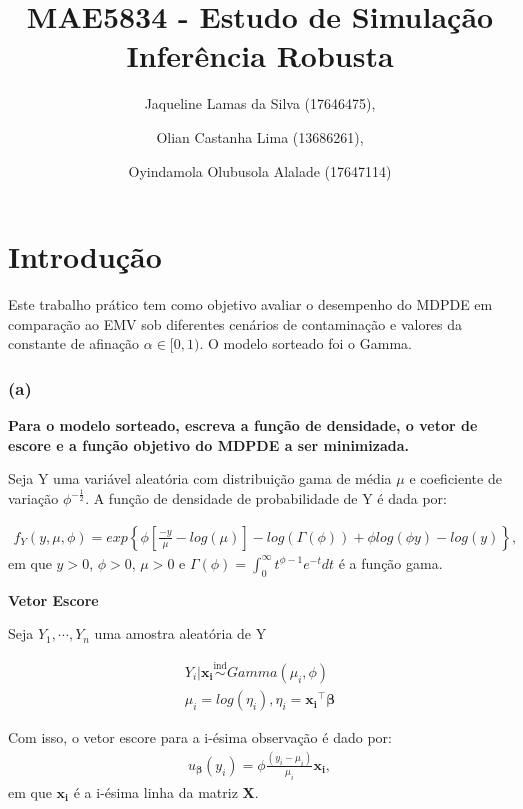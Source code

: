 \documentclass[
  letterpaper,
  DIV=11,
  numbers=noendperiod]{scrartcl}
\title{\LARGE \textbf{MAE5834 - Estudo de Simulação Inferência Robusta}}
\author{Jaqueline Lamas da Silva (17646475), \and Olian Castanha Lima
(13686261), \and Oyindamola Olubusola Alalade (17647114)}
\date{}
\renewcommand*\contentsname{Table of contents}
\newcommand\contentsname{Table of contents}
\begin{document}
\maketitle

\renewcommand*\contentsname{Sumário}
{
\setcounter{tocdepth}{3}
\tableofcontents
}

\newpage

\section{Introdução}\label{introduuxe7uxe3o}

Este trabalho prático tem como objetivo avaliar o desempenho do MDPDE em
comparação ao EMV sob diferentes cenários de contaminação e valores da
constante de afinação \(\alpha \in [0,1)\). O modelo sorteado foi o
Gamma.

\subsubsection{(a)}\label{a}

\textbf{Para o modelo sorteado, escreva a função de densidade, o vetor
de escore e a função objetivo do MDPDE a ser minimizada.}

Seja Y uma variável aleatória com distribuição gama de média \(\mu\) e
coeficiente de variação \(\phi^{-\frac{1}{2}}\). A função de densidade
de probabilidade de Y é dada por:

\begin{align*}
f_Y(y,\mu,\phi) = exp\left\{ \phi \left[ \frac{-y}{\mu} - log(\mu) \right] - log(\Gamma(\phi)) + \phi log(\phi y) - log(y) \right\},
\end{align*} em que \(y>0\), \(\phi>0\), \(\mu>0\) e
\(\Gamma(\phi) = \int_0^\infty t ^{\phi -1} e^{-t}dt\) é a função gama.

\textbf{Vetor Escore}

Seja \(Y_1, \cdots, Y_n\) uma amostra aleatória de Y

\begin{align*}
Y_i|\mathbf{x_i} \overset{\text{ind}}{\sim} Gamma (\mu_i, \phi) \\
\mu_i = log(\eta_i), \eta_i = \mathbf{x_i}^{\intercal} \boldsymbol{\beta}
\end{align*}

Com isso, o vetor escore para a i-ésima observação é dado por:
\begin{align*} 
u_{\boldsymbol{\beta}}(y_i) = \phi \frac{(y_i - \mu_i)}{\mu_i} \mathbf{x_i},
\end{align*} em que \(\mathbf{x_i}\) é a i-ésima linha da matriz
\(\mathbf{X}\).
\end{document}
